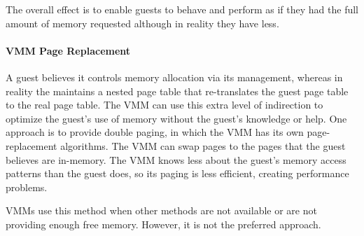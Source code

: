 The overall effect is to enable guests to behave and perform as if they had the full amount of memory requested although in reality they have less.

\paragraph{VMM Page Replacement}\label{par:VMM_Page_Replacement}
A guest believes it controls memory allocation via its  management, whereas in reality the  maintains a nested page table that re-translates the guest page table to the real page table.
The VMM can use this extra level of indirection to optimize the guest’s use of memory without the guest’s knowledge or help.
One approach is to provide double paging, in which the VMM has its own page-replacement algorithms.
The VMM can swap pages to the  pages that the guest believes are in-memory.
The VMM knows less about the guest's memory access patterns than the guest does, so its paging is less efficient, creating performance problems.

VMMs use this method when other methods are not available or are not providing enough free memory.
However, it is not the preferred approach.


